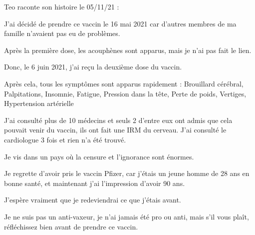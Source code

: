 Teo raconte son histoire le 05/11/21 :

J'ai décidé de prendre ce vaccin le 16 mai 2021 car d'autres membres de ma
famille n'avaient pas eu de problèmes.

Après la première dose, les acouphènes sont apparus, mais je n'ai pas fait le
lien.

Donc, le 6 juin 2021, j'ai reçu la deuxième dose du vaccin.

Après cela, tous les symptômes sont apparus rapidement : Brouillard cérébral,
Palpitations, Insomnie, Fatigue, Pression dans la tête, Perte de poids,
Vertiges, Hypertension artérielle

J'ai consulté plus de 10 médecins et seuls 2 d'entre eux ont admis que cela
pouvait venir du vaccin, ils ont fait une IRM du cerveau. J'ai consulté le
cardiologue 3 fois et rien n'a été trouvé.

Je vis dans un pays où la censure et l'ignorance sont énormes.

Je regrette d'avoir pris le vaccin Pfizer, car j'étais un jeune homme de 28 ans
en bonne santé, et maintenant j'ai l'impression d'avoir 90 ans.

J'espère vraiment que je redeviendrai ce que j'étais avant.

Je ne suis pas un anti-vaxeur, je n'ai jamais été pro ou anti, mais s'il vous
plaît, réfléchissez bien avant de prendre ce vaccin.
